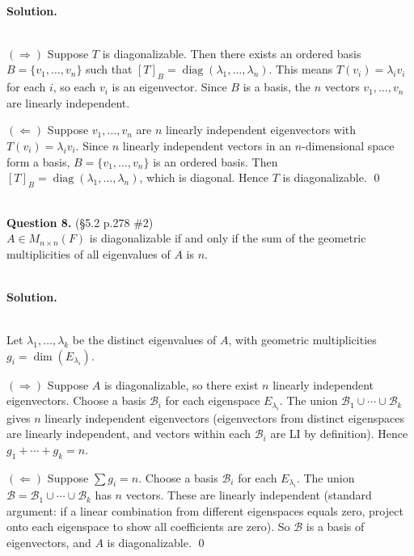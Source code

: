 \documentclass{article}
\begin{document}
\noindent\\
\textbf{Solution.}\\
\quad\\
\begin{mdframed}[linewidth=1pt]
$(\Rightarrow)$ Suppose $T$ is diagonalizable. Then there exists an ordered basis $B = \{v_1, \dots, v_n\}$ such that $[T]_B = \operatorname{diag}(\lambda_1, \dots, \lambda_n)$. This means $T(v_i) = \lambda_i v_i$ for each $i$, so each $v_i$ is an eigenvector. Since $B$ is a basis, the $n$ vectors $v_1, \dots, v_n$ are linearly independent.

$(\Leftarrow)$ Suppose $v_1, \dots, v_n$ are $n$ linearly independent eigenvectors with $T(v_i) = \lambda_i v_i$. Since $n$ linearly independent vectors in an $n$-dimensional space form a basis, $B = \{v_1, \dots, v_n\}$ is an ordered basis. Then $[T]_B = \operatorname{diag}(\lambda_1, \dots, \lambda_n)$, which is diagonal. Hence $T$ is diagonalizable. \qed
\end{mdframed}

\bigskip


\hfill \break  $~\!\!$ \dotfill \medskip \\
\textbf{Question 8.} (\S5.2 p.278 \#2)\\
$A \in M_{n \times n}(F)$ is diagonalizable if and only if the sum of the geometric multiplicities of all eigenvalues of $A$ is $n$.

\noindent\\
\textbf{Solution.}\\
\quad\\
\begin{mdframed}[linewidth=1pt]
Let $\lambda_1, \dots, \lambda_k$ be the distinct eigenvalues of $A$, with geometric multiplicities $g_i = \dim(E_{\lambda_i})$.

$(\Rightarrow)$ Suppose $A$ is diagonalizable, so there exist $n$ linearly independent eigenvectors. Choose a basis $\mathcal{B}_i$ for each eigenspace $E_{\lambda_i}$. The union $\mathcal{B}_1 \cup \cdots \cup \mathcal{B}_k$ gives $n$ linearly independent eigenvectors (eigenvectors from distinct eigenspaces are linearly independent, and vectors within each $\mathcal{B}_i$ are LI by definition). Hence $g_1 + \cdots + g_k = n$.

$(\Leftarrow)$ Suppose $\sum g_i = n$. Choose a basis $\mathcal{B}_i$ for each $E_{\lambda_i}$. The union $\mathcal{B} = \mathcal{B}_1 \cup \cdots \cup \mathcal{B}_k$ has $n$ vectors. These are linearly independent (standard argument: if a linear combination from different eigenspaces equals zero, project onto each eigenspace to show all coefficients are zero). So $\mathcal{B}$ is a basis of eigenvectors, and $A$ is diagonalizable. \qed
\end{mdframed}
\end{document}
